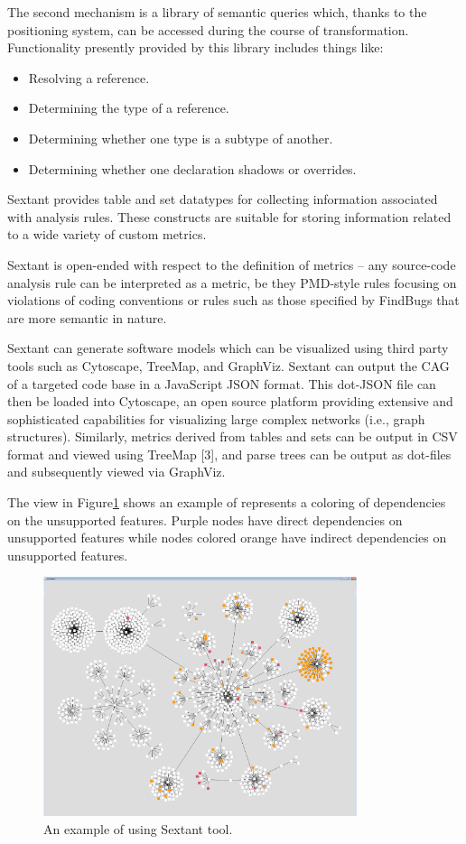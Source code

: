 The second mechanism is a library of semantic queries which, thanks to the positioning system, can be accessed during the course of transformation. Functionality presently provided by this library includes things like:
\begin{itemize}
	\item Resolving a reference.
	\item Determining the type of a reference.
	\item Determining whether one type is a subtype of another.
	\item Determining whether one declaration shadows or overrides.
\end{itemize}
 
Sextant provides table and set datatypes for collecting information associated with analysis rules. These constructs are suitable for storing information related to a wide variety of custom metrics.

Sextant is open-ended with respect to the definition of metrics – any source-code analysis rule can be interpreted as a metric, be they PMD-style rules focusing on violations of coding conventions or rules such as those specified by FindBugs that are more semantic in nature.

Sextant can generate software models which can be visualized using third party tools such as Cytoscape, TreeMap, and GraphViz. Sextant can output the CAG of a targeted code base in a JavaScript JSON format. This dot-JSON file can then be loaded into Cytoscape, an open source platform providing
extensive and sophisticated capabilities for visualizing large complex networks (i.e., graph structures). Similarly, metrics derived from tables and sets can be output in CSV format and viewed using TreeMap [3], and parse trees can be output as dot-files and subsequently viewed via GraphViz.

The view in Figure\ref{fig:1} shows an example of represents a coloring of
dependencies on the unsupported features. Purple nodes have direct dependencies on unsupported features while nodes colored orange have indirect dependencies on unsupported features.

\begin{figure}[h]
	\centering
	\includegraphics[height=70mm]{figures/1.png}
	\caption{An example of using Sextant tool.}
	\label{fig:1}
\end{figure}

